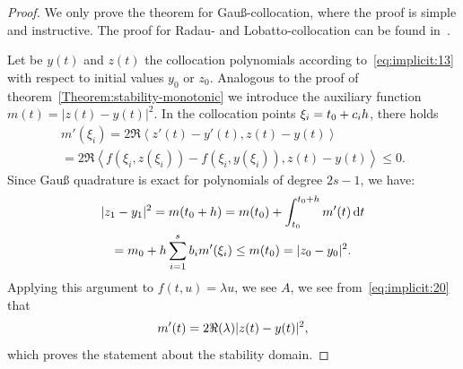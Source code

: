 \begin{proof}
  We only prove the theorem for Gauß-collocation, where the proof is
  simple and instructive. The proof for Radau- and Lobatto-collocation
  can be found in~\cite{HairerWanner10}.

  Let be $y(t)$ and $z(t)$ the collocation polynomials according
  to~\eqref{eq:implicit:13} with respect to initial values $y_0$ or
  $z_0$. Analogous to the proof of
  theorem~\ref{Theorem:stability-monotonic} we introduce the auxiliary
  function $m(t) = | z(t)-y(t)|^2$. In the collocation points
  $\xi_i = t_0 + c_i h$, there holds
  \begin{multline}
    \label{eq:implicit:20}
    m'(\xi_i) = 2 \Re\left<
      z'(t)-y'(t),z(t)-y(t)\right>
    \\
    = 2 \Re\left<f(\xi_i,z(\xi_i)) -
      f(\xi_i,y(\xi_i)),z(t)-y(t)\right> \le 0. 
  \end{multline}
  Since Gauß quadrature is exact for polynomials of degree $2s-1$, we have:
  \begin{multline*}
    |z_1-y_1|^2 = m(t_0+h) = m(t_0) + \int_{t_0}^{t_0+h} m'(t)\,\mathrm{d} t
    \\
    = m_0+h \sum_{i=1}^s b_i m'(\xi_i) \le m(t_0) =  |z_0-y_0|^2.
  \end{multline*}
  Applying this argument to $f(t,u) = \lambda u$, we see 
  $A$, we see from~\eqref{eq:implicit:20} that
  \begin{gather*}
    m'(t) = 2\Re(\lambda) \lvert z(t)-y(t)\rvert^2,
  \end{gather*}
  which proves the statement about the stability domain.
\end{proof}

